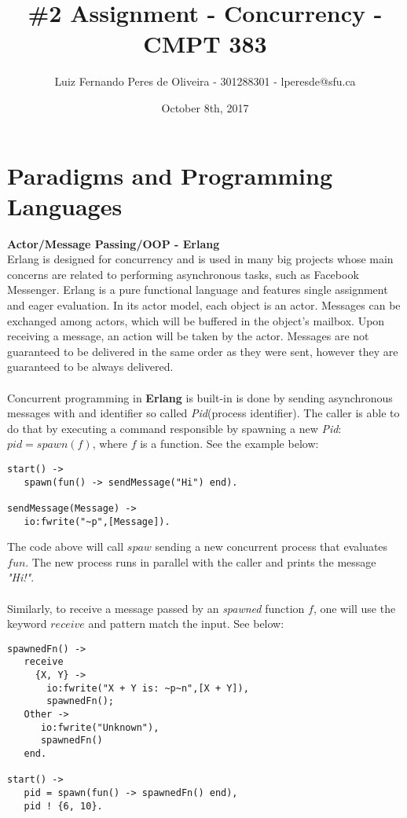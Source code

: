 \documentclass[conference]{IEEEtran}
\title{\#2 Assignment - Concurrency - CMPT 383}
\author{Luiz Fernando Peres de Oliveira - 301288301 - lperesde@sfu.ca}
\date{October 8th, 2017}
\begin{document}
\maketitle

\section{Paradigms and Programming Languages}

\textbf{ Actor/Message Passing/OOP - Erlang } \\
Erlang is designed for concurrency and is used in many big projects whose main concerns are related to performing asynchronous tasks, such as Facebook Messenger. Erlang is a pure functional language and features single assignment and eager evaluation. In its actor model, each object is an actor. Messages can be exchanged among actors, which will be buffered in the object's mailbox. Upon receiving a message, an action will be taken by the actor. Messages are not guaranteed to be delivered in the same order as they were sent, however they are guaranteed to be always delivered.
\\\\
Concurrent programming in \textbf{Erlang} is built-in is done by sending asynchronous messages with and identifier so called \textit{Pid}(process identifier). The caller is able to do that by executing a command responsible by spawning a new \textit{Pid}: $pid = spawn(f)$, where $f$ is a function. See the example below:
\lstset{language=erlang}
\begin{lstlisting}[frame=single]
start() ->
   spawn(fun() -> sendMessage("Hi") end). 

sendMessage(Message) ->
   io:fwrite("~p",[Message]).
\end{lstlisting}

The code above will call $spaw$ sending a new concurrent process that evaluates $fun$. The new process runs in parallel with the caller and prints the message \textit{"Hi!"}. 
\\\\
Similarly, to receive a message passed by an \textit{spawned} function $f$, one will use the keyword $receive$ and pattern match the input. See below: 
\begin{lstlisting}[frame=single]
spawnedFn() ->
   receive 
     {X, Y} -> 
       io:fwrite("X + Y is: ~p~n",[X + Y]), 
       spawnedFn(); 
   Other ->
      io:fwrite("Unknown"), 
      spawnedFn() 
   end. 

start() ->
   pid = spawn(fun() -> spawnedFn() end), 
   pid ! {6, 10}.
\end{lstlisting}
\end{document}
